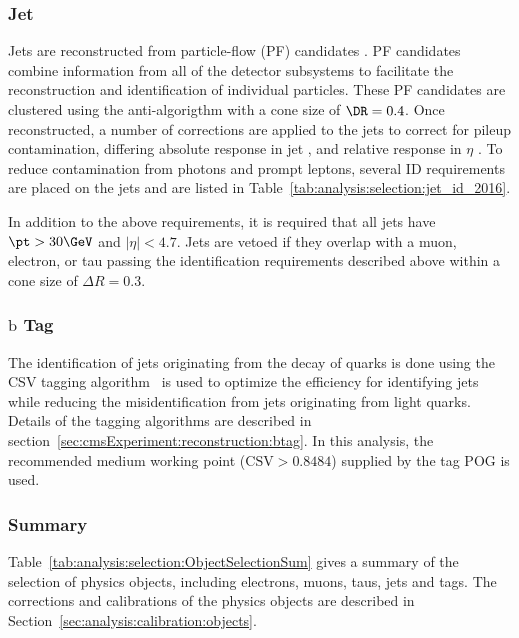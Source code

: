 \subsubsection{Jet}
Jets are reconstructed from particle-flow (PF) candidates \cite{ref:pf}. PF candidates combine information from all of the detector subsystems to facilitate the reconstruction and identification of individual particles.  These PF candidates are clustered using the anti-\kt algorigthm \cite{Cacciari:2008gp} with a cone size of $\DR = 0.4$. Once reconstructed, a number of corrections are applied to the jets to correct for pileup contamination, differing absolute response in jet \pt, and relative response in $\eta$ \cite{ref:jetscale}.  To reduce contamination from photons and prompt leptons, several ID requirements are placed on the jets and are listed in Table~\ref{tab:analysis:selection:jet_id_2016}.



\noindent In addition to the above requirements, it is required that all jets have $\pt > 30\GeV$ and $|\eta| < 4.7$.  Jets are vetoed if they overlap with a muon, electron, or tau passing the identification requirements described above within a cone size of $\Delta R = 0.3$. 

\subsubsection{$\mathrm{b}$ Tag} The identification of jets originating from the decay of \PQb quarks is done using the CSV \PQb tagging algorithm~\cite{Sirunyan:2298594} is used to optimize the efficiency for identifying \PQb jets while reducing the misidentification from jets originating from light quarks. Details of the \PQb tagging algorithms are described in section~\ref{sec:cmsExperiment:reconstruction:btag}.  In this analysis, the recommended medium working point ($\text{CSV} > 0.8484$) supplied by the \PQb tag POG is used. 




\subsubsection{Summary}

Table~\ref{tab:analysis:selection:ObjectSelectionSum} gives a summary of the selection of physics objects, including electrons, muons, taus, jets and \PQb tags. The corrections and calibrations of the physics objects are described in Section~\ref{sec:analysis:calibration:objects}.




